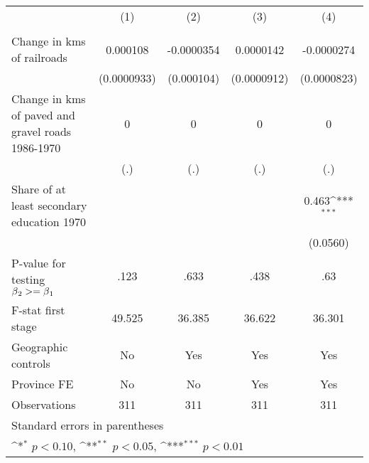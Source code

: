{
\def\sym#1{\ifmmode^{#1}\else\(^{#1}\)\fi}
\begin{tabular}{l*{4}{c}}
\hline\hline
                &\multicolumn{1}{c}{(1)}&\multicolumn{1}{c}{(2)}&\multicolumn{1}{c}{(3)}&\multicolumn{1}{c}{(4)}\\
                &\multicolumn{1}{c}{}&\multicolumn{1}{c}{}&\multicolumn{1}{c}{}&\multicolumn{1}{c}{}\\
\hline
Change in kms of railroads& 0.000108         &-0.0000354         &0.0000142         &-0.0000274         \\
                &(0.0000933)         &(0.000104)         &(0.0000912)         &(0.0000823)         \\
[1em]
Change in kms of paved and gravel roads 1986-1970&        0         &        0         &        0         &        0         \\
                &      (.)         &      (.)         &      (.)         &      (.)         \\
[1em]
Share of at least secondary education 1970&                  &                  &                  &    0.463\sym{***}\\
                &                  &                  &                  & (0.0560)         \\
\hline
P-value for testing $\beta\\_2 >= \beta\\_1$&     .123         &     .633         &     .438         &      .63         \\
F-stat first stage&   49.525         &   36.385         &   36.622         &   36.301         \\
Geographic controls&       No         &      Yes         &      Yes         &      Yes         \\
Province FE     &       No         &       No         &      Yes         &      Yes         \\
Observations    &      311         &      311         &      311         &      311         \\
\hline\hline
\multicolumn{5}{l}{\footnotesize Standard errors in parentheses}\\
\multicolumn{5}{l}{\footnotesize \sym{*} \(p<0.10\), \sym{**} \(p<0.05\), \sym{***} \(p<0.01\)}\\
\end{tabular}
}
